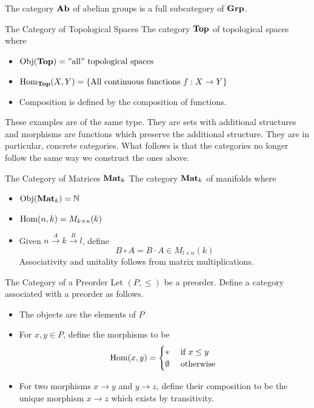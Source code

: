 \documentclass[a4paper]{article}
\begin{document}
The category $\bold{Ab}$ of abelian groups is a full subcategory of $\bold{Grp}$. 

\begin{defn}{The Category of Topological Spaces}{} The category $\bold{Top}$ of topological spaces where 
\begin{itemize}
\item $\operatorname{Obj}(\bold{Top})=\text{''all'' topological spaces}$
\item $\operatorname{Hom}_{\bold{Top}}(X,Y)=\{\text{All continuous functions }f:X\to Y\}$
\item Composition is defined by the composition of functions. 
\end{itemize}
\end{defn}

These examples are of the same type. They are sets with additional structures and morphisms are functions which preserve the additional structure. They are in particular, concrete categories. What follows is that the categories no longer follow the same way we construct the ones above. 

\begin{defn}{The Category of Matrices $\bold{Mat}_k$}{} The category $\bold{Mat}_k$ of manifolds where 
\begin{itemize}
\item $\operatorname{Obj}(\bold{Mat}_k)=\mathbb{N}$
\item $\operatorname{Hom}(n,k)=M_{k\times n}(k)$
\item Given $n\overset{A}{\rightarrow}k\overset{B}{\rightarrow}l$, define $$B\circ A=B\cdot A\in M_{l\times n}(k)$$ Associativity and unitality follows from matrix multiplications. 
\end{itemize}
\end{defn}

\begin{defn}{The Category of a Preorder}{} Let $(P,\leq)$ be a preorder. Define a category associated with a preorder as follows. 
\begin{itemize}
\item The objects are the elements of $P$
\item For $x,y\in P$, define the morphisms to be $$\operatorname{Hom}(x,y)=\begin{cases}
\ast & \text{ if } x\leq y\\
\emptyset & \text{ otherwise }
\end{cases}$$
\item For two morphisms $x\to y$ and $y\to z$, define their composition to be the unique morphism $x\to z$ which exists by transitivity. 
\end{itemize}
\end{defn}
\end{document}
